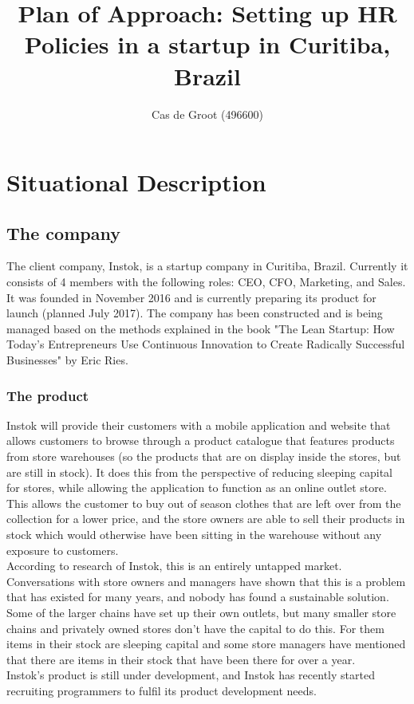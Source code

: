 \documentclass[man]{apa6}
\title{Plan of Approach: Setting up HR Policies in a startup in Curitiba, Brazil}
\author{Cas de Groot (496600)}
\affiliation{HAN University of Applied Sciences}
\begin{document}
\maketitle
\tableofcontents
\clearpage
\section{Situational Description}
\subsection{The company}
The client company, Instok, is a startup company in Curitiba, Brazil. Currently it consists of 4 members with the following roles: CEO, CFO, Marketing, and Sales. It was founded in November 2016 and is currently preparing its product for launch (planned July 2017). The company has been constructed and is being managed based on the methods explained in the book "The Lean Startup: How Today's Entrepreneurs Use Continuous Innovation to Create Radically Successful Businesses" by Eric Ries. 

\subsubsection{The product}
Instok will provide their customers with a mobile application and website that allows customers to browse through a product catalogue that features products from store warehouses (so the products that are on display inside the stores, but are still in stock). It does this from the perspective of reducing sleeping capital for stores, while allowing the application to function as an online outlet store. This allows the customer to buy out of season clothes that are left over from the collection for a lower price, and the store owners are able to sell their products in stock which would otherwise have been sitting in the warehouse without any exposure to customers.\\
According to research of Instok, this is an entirely untapped market. Conversations with store owners and managers have shown that this is a problem that has existed for many years, and nobody has found a sustainable solution. Some of the larger chains have set up their own outlets, but many smaller store chains and privately owned stores don't have the capital to do this. For them items in their stock are sleeping capital \parencite{SNELL2009} and some store managers have mentioned that there are items in their stock that have been there for over a year.\\
Instok's product is still under development, and Instok has recently started recruiting programmers to fulfil its product development needs. 
\end{document}
